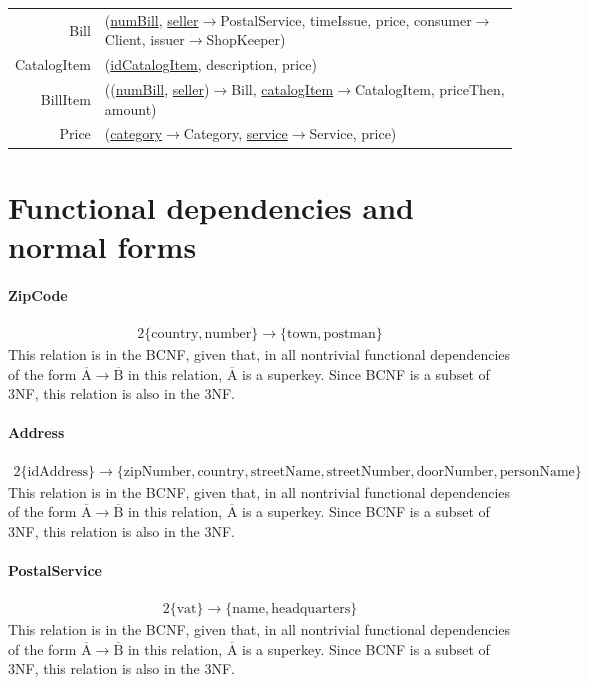 \documentclass{report}[a4paper]
\theoremstyle{remark}
\begin{document}
\begin{center}
\begin{tabular}{r p{144mm}}
        Bill            & (\uline{numBill}, \uline{seller}$\rightarrow$PostalService, timeIssue, price, consumer$\rightarrow$Client, issuer$\rightarrow$ShopKeeper)                                   \\
        CatalogItem     & (\uline{idCatalogItem}, description, price)                           \\
        BillItem        & ((\uline{numBill}, \uline{seller})$\rightarrow$Bill, \uline{catalogItem}$\rightarrow$CatalogItem, priceThen, amount) \\
        Price           & (\uline{category}$\rightarrow$Category, \uline{service}$\rightarrow$Service, price)
    \end{tabular}
\end{center}
\chapter{Functional dependencies and normal forms}
\subsubsection{ZipCode}
\begin{alignat*}{2}
\{\text{country},\text{number}\} \rightarrow \{\text{town}, \text{postman}\}
\end{alignat*}
This relation is in the BCNF, given that, in all nontrivial functional dependencies of the form $\overline{\text{A}} \rightarrow \overline{\text{B}}$ in this relation, $\overline{\text{A}}$ is a superkey. Since BCNF is a subset of 3NF, this relation is also in the 3NF.
\subsubsection{Address}
\begin{alignat*}{2}
    \{\text{idAddress}\} \rightarrow \{\text{zipNumber}, \text{country}, \text{streetName}, \text{streetNumber}, \text{doorNumber}, \text{personName}\}
\end{alignat*}
This relation is in the BCNF, given that, in all nontrivial functional dependencies of the form $\overline{\text{A}} \rightarrow \overline{\text{B}}$ in this relation, $\overline{\text{A}}$ is a superkey. Since BCNF is a subset of 3NF, this relation is also in the 3NF.
\subsubsection{PostalService}
\begin{alignat*}{2}
    \{\text{vat}\} \rightarrow \{\text{name},\text{headquarters}\}
\end{alignat*}
This relation is in the BCNF, given that, in all nontrivial functional dependencies of the form $\overline{\text{A}} \rightarrow \overline{\text{B}}$ in this relation, $\overline{\text{A}}$ is a superkey. Since BCNF is a subset of 3NF, this relation is also in the 3NF.
\end{document}
